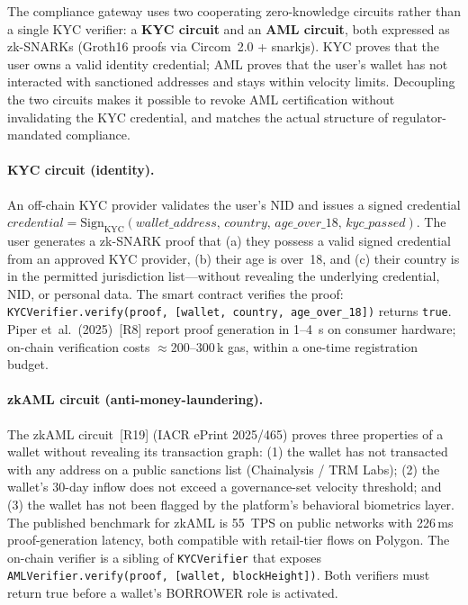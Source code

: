 \documentclass[12pt,a4paper]{report}
\begin{document}
The compliance gateway uses two cooperating zero-knowledge circuits rather than a single KYC verifier: a \textbf{KYC circuit} and an \textbf{AML circuit}, both expressed as zk-SNARKs (Groth16 proofs via Circom~2.0 + snarkjs). KYC proves that the user owns a valid identity credential; AML proves that the user's wallet has not interacted with sanctioned addresses and stays within velocity limits. Decoupling the two circuits makes it possible to revoke AML certification without invalidating the KYC credential, and matches the actual structure of regulator-mandated compliance.

\paragraph{KYC circuit (identity).}
An off-chain KYC provider validates the user's NID and issues a signed credential
\(\textit{credential} = \text{Sign}_{\text{KYC}}(\textit{wallet\_address},\, \textit{country},\, \textit{age\_over\_18},\, \textit{kyc\_passed})\).
The user generates a zk-SNARK proof that (a) they possess a valid signed credential from an approved KYC provider, (b) their age is over~18, and (c) their country is in the permitted jurisdiction list---without revealing the underlying credential, NID, or personal data. The smart contract verifies the proof:
\texttt{KYCVerifier.verify(proof, [wallet, country, age\_over\_18])} returns \texttt{true}.
Piper et~al.~(2025)~[R8] report proof generation in 1--4~s on consumer hardware; on-chain verification costs $\approx$200--300\,k gas, within a one-time registration budget.

\paragraph{zkAML circuit (anti-money-laundering).}
The zkAML circuit~[R19] (IACR ePrint 2025/465) proves three properties of a wallet without revealing its transaction graph: (1) the wallet has not transacted with any address on a public sanctions list (Chainalysis / TRM Labs); (2) the wallet's 30-day inflow does not exceed a governance-set velocity threshold; and (3) the wallet has not been flagged by the platform's behavioral biometrics layer. The published benchmark for zkAML is 55~TPS on public networks with 226\,ms proof-generation latency, both compatible with retail-tier flows on Polygon. The on-chain verifier is a sibling of \texttt{KYCVerifier} that exposes \texttt{AMLVerifier.verify(proof, [wallet, blockHeight])}. Both verifiers must return true before a wallet's BORROWER role is activated.
\end{document}
